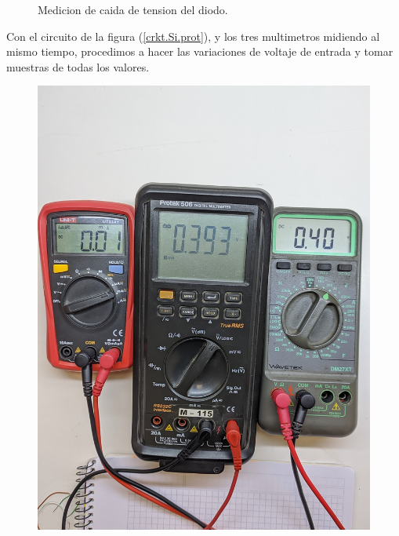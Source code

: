 \documentclass[chaptersright]{informeutn}
\begin{document}
\begin{figure}[H]
\begin{minipage}{0.3\textwidth}
          \caption{Medicion de caida de tension del diodo.}
          \label{crkt.Si.mult.vd}
        \end{minipage}
      \end{figure}

      Con el circuito de la figura (\ref{crkt.Si.prot}), y los tres multimetros midiendo al mismo tiempo, procedimos a
      hacer las variaciones de voltaje de entrada y tomar muestras de todas los valores.

      \begin{figure}[!ht]
        \centering
        \begin{minipage}{0.25\textwidth}
          \includegraphics[width=1\textwidth]{pictures/mult_crkt-1_03.jpg}
        \end{minipage}
        \begin{minipage}{0.25\textwidth}

\end{minipage}
\end{figure}
\end{document}
